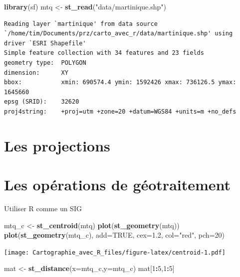 \documentclass[]{book}
\newenvironment{Shaded}{\begin{snugshade}}{\end{snugshade}}
\newcommand{\DataTypeTok}[1]{\textcolor[rgb]{0.13,0.29,0.53}{#1}}
\newcommand{\DecValTok}[1]{\textcolor[rgb]{0.00,0.00,0.81}{#1}}
\newcommand{\FloatTok}[1]{\textcolor[rgb]{0.00,0.00,0.81}{#1}}
\newcommand{\KeywordTok}[1]{\textcolor[rgb]{0.13,0.29,0.53}{\textbf{#1}}}
\newcommand{\NormalTok}[1]{#1}
\newcommand{\OperatorTok}[1]{\textcolor[rgb]{0.81,0.36,0.00}{\textbf{#1}}}
\newcommand{\OtherTok}[1]{\textcolor[rgb]{0.56,0.35,0.01}{#1}}
\newcommand{\StringTok}[1]{\textcolor[rgb]{0.31,0.60,0.02}{#1}}
\begin{document}
\begin{Shaded}
\begin{Highlighting}[]
\KeywordTok{library}\NormalTok{(sf)}
\NormalTok{mtq <-}\StringTok{ }\KeywordTok{st_read}\NormalTok{(}\StringTok{"data/martinique.shp"}\NormalTok{)}
\end{Highlighting}
\end{Shaded}

\begin{verbatim}
Reading layer `martinique' from data source `/home/tim/Documents/prz/carto_avec_r/data/martinique.shp' using driver `ESRI Shapefile'
Simple feature collection with 34 features and 23 fields
geometry type:  POLYGON
dimension:      XY
bbox:           xmin: 690574.4 ymin: 1592426 xmax: 736126.5 ymax: 1645660
epsg (SRID):    32620
proj4string:    +proj=utm +zone=20 +datum=WGS84 +units=m +no_defs
\end{verbatim}

\hypertarget{les-projections}{%
\section{Les projections}\label{les-projections}}

\hypertarget{les-operations-de-geotraitement}{%
\section{Les opérations de géotraitement}\label{les-operations-de-geotraitement}}

Utiliser R comme un SIG

\begin{Shaded}
\begin{Highlighting}[]
\NormalTok{mtq_c <-}\StringTok{ }\KeywordTok{st_centroid}\NormalTok{(mtq)}
\KeywordTok{plot}\NormalTok{(}\KeywordTok{st_geometry}\NormalTok{(mtq))}
\KeywordTok{plot}\NormalTok{(}\KeywordTok{st_geometry}\NormalTok{(mtq_c), }\DataTypeTok{add=}\OtherTok{TRUE}\NormalTok{, }\DataTypeTok{cex=}\FloatTok{1.2}\NormalTok{, }\DataTypeTok{col=}\StringTok{"red"}\NormalTok{, }\DataTypeTok{pch=}\DecValTok{20}\NormalTok{)}
\end{Highlighting}
\end{Shaded}

\texttt{[image: Cartographie\_avec\_R\_files/figure-latex/centroid-1.pdf]}

\begin{Shaded}
\begin{Highlighting}[]
\NormalTok{mat <-}\StringTok{ }\KeywordTok{st_distance}\NormalTok{(}\DataTypeTok{x=}\NormalTok{mtq_c,}\DataTypeTok{y=}\NormalTok{mtq_c)}
\NormalTok{mat[}\DecValTok{1}\OperatorTok{:}\DecValTok{5}\NormalTok{,}\DecValTok{1}\OperatorTok{:}\DecValTok{5}\NormalTok{]}
\end{Highlighting}
\end{Shaded}
\end{document}
